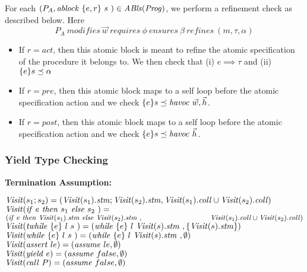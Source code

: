 For each $(P_{A}, \mathit{ablock}\ {\{e,r\}}\ {s}\ ) \in \mathit{ABls}(\mathit{Prog})$, we perform a refinement check as described below. Here 
$$P_{A}\ \mathit{modifies}\
\vec{w}\ \mathit{requires}\ \phi\ \mathit{ensures}\ \beta\
\mathit{refines}\ (m, \tau, \alpha)$$
\begin{itemize}
\item If $r = \mathit{act}$, then this atomic block is meant to refine the atomic specification of the procedure it belongs to. We then check that 
(i) $e \implies \tau$ and 
(ii) $\{ {e} \} {s} \preceq {\alpha}$
\item If $r = \mathit{pre}$, then this atomic block maps to a self loop before the atomic specification action and we check $\{ {e} \} {s} \preceq {\mathit{havoc }\ \vec{w}, \vec{h}}$. 
\item If $r = \mathit{post}$, then this atomic block maps to a self loop before the atomic specification action and we check $\impl{e}{s}{\mathit{havoc }\ \hiddenVars}$. 
\end{itemize}

\subsubsection{Yield Type Checking}

{\bf Termination Assumption:}

\noindent
${\mathit{Visit}}(s_1; s_2) = ( {\mathit{Visit}}(s_1).\mathit{stm}; {\mathit{Visit}}(s_2).\mathit{stm}, {\mathit{Visit}}(s_1).\mathit{coll} \cup {\mathit{Visit}}(s_2).\mathit{coll})$\\
${\mathit{Visit}}({\mathit{if}\ {e}\ }{\mathit{then}\ {s_1}\ }{\mathit{else}\ { s_2}\ }) = $  \\
\hspace*{1.3cm}$( \ite{e}{\Visit(s_1).\stm}{\Visit(s_2).\stm}, \\
\hspace*{3.3cm}\Visit(s_1).\coll \cup \Visit(s_2).\coll)$\\
${\mathit{Visit}}(\mathit{twhile}\ \{{e}\}\ {{l}\ } {{s}\ }) = ( \mathit{while}\ \{{e}\}\ {{l}\ } {{{\mathit{Visit}}(s).\mathit{stm}}\ }, \{ {\mathit{Visit}}(s).\mathit{stm} \} )$\\
${\mathit{Visit}}(\mathit{while}\ \{{e}\}\ {{l}\ } {{s}\ }) = ( \mathit{while}\ \{{e}\}\ {{l}\ } {{{\mathit{Visit}}(s).\mathit{stm}}\ }, \emptyset)$\\
${\mathit{Visit}}(\mathit{assert}\ le) = (\mathit{assume}\ le, \emptyset)$\\
${\mathit{Visit}}(\mathit{yield}\ e) = (\mathit{assume}\ false, \emptyset)$\\
${\mathit{Visit}}(\mathit{call}\ P) = (\mathit{assume}\ false, \emptyset)$\\


